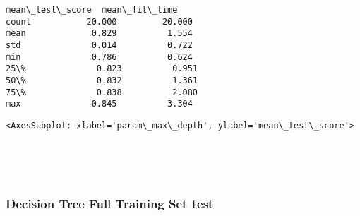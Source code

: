 \documentclass[11pt]{article}
\makeatletter
\newcommand{\boxspacing}{\kern\kvtcb@left@rule\kern\kvtcb@boxsep}
\newcommand{\prompt}[4]{
        {\ttfamily\llap{{\color{#2}[#3]:\hspace{3pt}#4}}\vspace{-\baselineskip}}
    }
\makeatother
\begin{document}
    
    \begin{Verbatim}[commandchars=\\\{\}]
       mean\_test\_score  mean\_fit\_time
count           20.000         20.000
mean             0.829          1.554
std              0.014          0.722
min              0.786          0.624
25\%              0.823          0.951
50\%              0.832          1.361
75\%              0.838          2.080
max              0.845          3.304
    \end{Verbatim}

    
            \begin{tcolorbox}[breakable, size=fbox, boxrule=.5pt, pad at break*=1mm, opacityfill=0]
\prompt{Out}{outcolor}{20}{\boxspacing}
\begin{Verbatim}[commandchars=\\\{\}]
<AxesSubplot: xlabel='param\_max\_depth', ylabel='mean\_test\_score'>
\end{Verbatim}
\end{tcolorbox}
        
    \begin{center}
    \end{center}
    { \hspace*{\fill} \\}
    
    \begin{center}
    \end{center}
    { \hspace*{\fill} \\}
    
    \hypertarget{decision-tree-full-training-set-test}{%
\subsubsection{Decision Tree Full Training Set
test}\label{decision-tree-full-training-set-test}}
\end{document}
